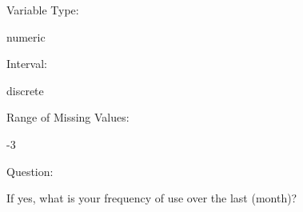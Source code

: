 \documentclass[
]{article}
\begin{document}
\begin{minipage}[t]{0.3\linewidth}

Variable Type:

\end{minipage}%
\begin{minipage}[t]{0.7\linewidth}

numeric

\end{minipage}

\begin{minipage}[t]{0.3\linewidth}

Interval:

\end{minipage}%
\begin{minipage}[t]{0.7\linewidth}

discrete

\end{minipage}

\begin{minipage}[t]{0.3\linewidth}

Range of Missing Values:

\end{minipage}%
\begin{minipage}[t]{0.7\linewidth}

-3

\end{minipage}

\begin{minipage}[t]{0.3\linewidth}

Question:

\end{minipage}%
\begin{minipage}[t]{0.7\linewidth}

If yes, what is your frequency of use over the last (month)?

\end{minipage}
\end{document}
